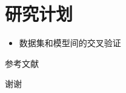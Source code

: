\documentclass{beamer} %
\begin{document}
\section{研究计划}

\begin{frame}
    \begin{itemize}
        \item 数据集和模型间的交叉验证
    \end{itemize}
\end{frame}


\begin{frame}[allowframebreaks]{参考文献} %
	\printbibliography[heading=reference]
\end{frame}


\begin{frame}
    \begin{center}
        {\Huge 谢谢}
    \end{center}
\end{frame}
\end{document}

